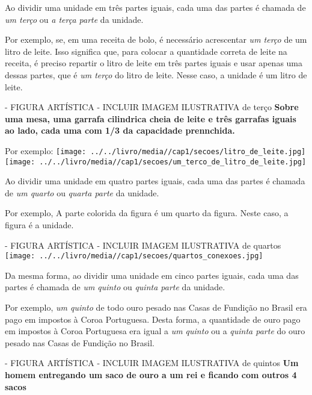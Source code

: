 \documentclass[a4,12pt]{book}
\begin{document}
Ao dividir uma unidade em três partes iguais, cada uma das partes é chamada de {\it um terço} ou {\it a terça parte} da unidade. 

Por exemplo, se, em uma receita de bolo, é necessário acrescentar {\it um terço} de um litro de leite. Isso significa que, para colocar a quantidade correta de leite na receita, é preciso repartir o litro de leite em três partes iguais e usar apenas uma dessas partes, que é {\it um terço} do litro de leite. Nesse caso, a unidade é um litro de leite.

\begin{imagem*}[breakable]{}{}   - FIGURA ARTÍSTICA - INCLUIR IMAGEM ILUSTRATIVA de terço   
  {\bf Sobre uma mesa, uma garrafa cilindrica cheia de leite e três garrafas iguais ao lado, cada uma com 1/3 da capacidade prennchida.}  
  
  Por exemplo:   
    \texttt{[image: ../../livro/media//cap1/secoes/litro\_de\_leite.jpg]}  
    \texttt{[image: ../../livro/media//cap1/secoes/um\_terco\_de\_litro\_de\_leite.jpg]}  
  
\end{imagem*}

Ao dividir uma unidade em quatro partes iguais, cada uma das partes é chamada de {\it um quarto} ou {\it quarta parte} da unidade. 

Por exemplo,
A parte colorida da figura é um quarto da figura. Neste caso, a figura é a unidade.

\begin{imagem*}[breakable]{}{}   - FIGURA ARTÍSTICA - INCLUIR IMAGEM ILUSTRATIVA de quartos  
    \texttt{[image: ../../livro/media//cap1/secoes/quartos\_conexoes.jpg]}  
   \end{imagem*}

Da mesma forma, ao dividir uma unidade em cinco partes iguais, cada uma das partes é chamada de {\it um quinto} ou {\it quinta parte} da unidade.

Por exemplo,
\emph{um quinto} de todo ouro pesado nas Casas de Fundição no Brasil era pago em impostos à Coroa Portuguesa. Desta forma, a quantidade de ouro pago em impostos à Coroa Portuguesa era igual a \emph{um quinto} ou a \emph{quinta parte} do ouro pesado nas Casas de Fundição no Brasil.

\begin{imagem*}[breakable]{}{}   - FIGURA ARTÍSTICA - INCLUIR IMAGEM ILUSTRATIVA de quintos   
  {\bf Um homem entregando um saco de ouro a um rei e ficando com outros 4 sacos}  
\end{imagem*}
\end{document}
